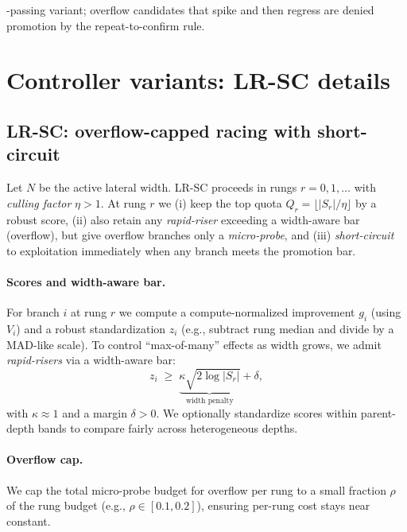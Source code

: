 \documentclass{article}
\begin{document}



-passing variant; overflow candidates that spike and then regress are denied promotion by the repeat-to-confirm rule.


\section{Controller variants: LR-SC details}\label{app:lrscr}
\subsection{LR-SC: overflow-capped racing with short-circuit}
\label{sec:lrscr}

Let $N$ be the active lateral width.
LR-SC proceeds in rungs $r=0,1,\dots$ with \emph{culling factor} $\eta>1$.
At rung $r$ we (i) keep the top quota $Q_r=\lfloor |S_r|/\eta \rfloor$ by a robust score, (ii) also retain any \emph{rapid-riser} exceeding a width-aware bar (overflow), but give overflow branches only a \emph{micro-probe}, and (iii) \emph{short-circuit} to exploitation immediately when any branch meets the promotion bar.

\paragraph{Scores and width-aware bar.}
For branch $i$ at rung $r$ we compute a compute-normalized improvement $g_i$ (using $V_i$) and a robust standardization $z_i$ (e.g., subtract rung median and divide by a MAD-like scale).
To control ``max-of-many'' effects as width grows, we admit \emph{rapid-risers} via a width-aware bar:
\[
z_i \;\ge\; \underbrace{\kappa \sqrt{2\log |S_r|}}_{\text{width penalty}} + \delta,
\]
with $\kappa\approx 1$ and a margin $\delta>0$.
We optionally standardize scores within parent-depth bands to compare fairly across heterogeneous depths.

\paragraph{Overflow cap.}
We cap the total micro-probe budget for overflow per rung to a small fraction $\rho$ of the rung budget (e.g., $\rho\in[0.1,0.2]$), ensuring per-rung cost stays near constant.
\end{document}
